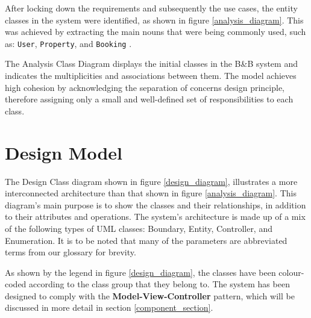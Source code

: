 After locking down the requirements and subsequently the use cases, the entity classes in the system were identified, as shown in figure \ref{analysis_diagram}. This was achieved by extracting the main nouns that were being commonly used, such as: \texttt{User}, \texttt{Property}, and \texttt{Booking} \cite{GangOfFour1994}.

The Analysis Class Diagram displays the initial classes in the B\&B system and indicates the multiplicities and associations between them. The model achieves high cohesion by acknowledging the separation of concerns design principle, therefore assigning only a small and well-defined set of responsibilities to each class.

\section{Design Model}
The Design Class diagram shown in figure \ref{design_diagram}, illustrates a more interconnected architecture than that shown in figure \ref{analysis_diagram}. This diagram's main purpose is to show the classes and their relationships, in addition to their attributes and operations. The system's architecture is made up of a mix of the following types of UML classes: Boundary, Entity, Controller, and Enumeration. It is to be noted that many of the parameters are abbreviated terms from our glossary for brevity.

As shown by the legend in figure \ref{design_diagram}, the classes have been colour-coded according to the class group that they belong to. The system has been designed to comply with the \textbf{Model-View-Controller} pattern, which will be discussed in more detail in section \ref{component_section}.

